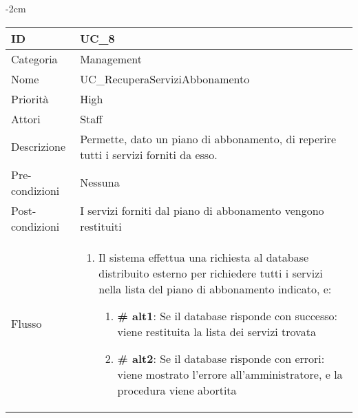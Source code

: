 \begin{center}
\begin{table}[bp]
    \centering
    \addtolength{\leftskip} {-2cm}
\begin{tabular}{ |p{2.6cm}|p{13cm}|  }
\hline
ID & UC\_8 \\\hline
Categoria & Management\\\hline
Nome & UC\_RecuperaServiziAbbonamento\\\hline
Priorità & High \\\hline
Attori &  Staff \\\hline
Descrizione & Permette, dato un piano di abbonamento, di reperire tutti i servizi forniti da esso.\\\hline
Pre-condizioni &  Nessuna\\\hline
Post-condizioni &  I servizi forniti dal piano di abbonamento vengono restituiti \\\hline
Flusso &  	\vspace{-5mm} \begin{enumerate}
			\item Il sistema effettua una richiesta al database distribuito esterno per richiedere tutti i servizi nella lista del piano di abbonamento indicato, e:
				\begin{enumerate}[  ]
				\item \textbf{\# alt1}: Se il database risponde con successo: viene restituita la lista dei servizi trovata
				\item \textbf{\# alt2}: Se il database risponde con errori: viene mostrato l'errore all'amministratore, e la procedura viene abortita
				\end{enumerate}
		\end{enumerate}\\\hline
\end{tabular}
\label{table_use_case:8}\newline
\end{table}


\end{center}
